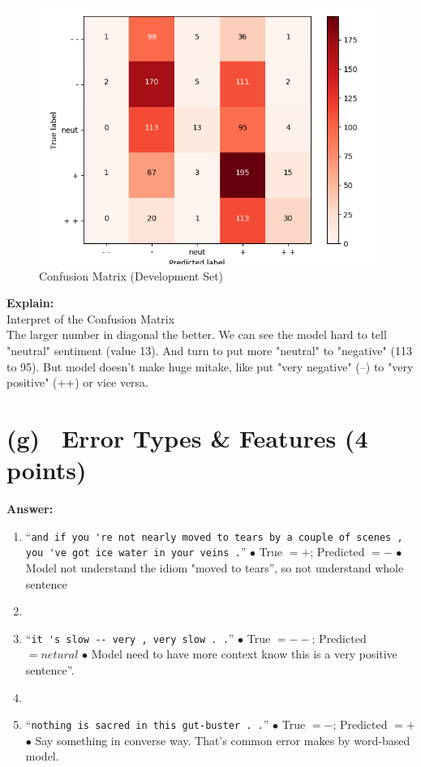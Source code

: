 \documentclass[fleqn]{MJD}
\newcommand{\subproblem}[2]{\section{(#1)~ #2}}
\newcommand{\0}{\emptyset}
\begin{document}
\begin{figure}[!htbp]\centering
	\label{figure:confusionmatrix}
	\caption{Confusion Matrix (Development Set)}
	\includegraphics[scale=0.8]{q4_dev_conf.png}
\end{figure}
\noindent \textbf{Explain:}\\
\noindent  Interpret of the Confusion Matrix \\
The larger number in diagonal the better. We can see the model hard to tell "neutral" sentiment (value 13). And turn to put more "neutral" to "negative" (113 to 95). But model doesn't make huge mitake, like put "very negative" (--) to "very positive" (++) or vice versa.



\newpage 

\subproblem{g}{Error Types \& Features (4 points)}
\noindent \textbf{Answer:} \\

\begin{enumerate}
	\item ``\verb|and if you 're not nearly moved to tears by a couple of scenes ,| \newline \verb|you 've got ice water in your veins .|''
	\subitem $\bullet$ True $= +$; Predicted $= -$
	\subitem $\bullet$ Model not understand the idiom  "moved to tears'', so not understand whole sentence
	\item[] 
	\item ``\verb|it 's slow -- very , very slow . .|''
	\subitem $\bullet$ True $= --$; Predicted $= netural$
	\subitem $\bullet$ Model need to have more context know this is a very positive sentence''.
	\item[]
	\item ``\verb|nothing is sacred in this gut-buster . .|''
	\subitem $\bullet$ True $= -$; Predicted $= +$
	\subitem $\bullet$ Say something in converse way. That's common error makes by word-based model.
\end{enumerate}
\end{document}
